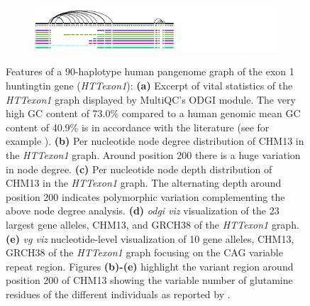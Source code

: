 \begin{figure}[ht!]
\begin{subfigure}{\linewidth}
    \end{subfigure}
    \begin{subfigure}{\linewidth}
        \caption{}
        \centering
        \includegraphics[width=1.0\linewidth, trim=-0.4cm 0.4cm 3.15cm 0cm]{fig/metrics/chr4_pan_HTTex1_STR_xg_svg}
        \label{fig:metrics-str}
    \end{subfigure}
	\caption{Features of a 90-haplotype human pangenome graph of the exon 1 huntingtin gene (\textit{HTTexon1}): \textbf{(a)} Excerpt of vital statistics of the \textit{HTTexon1} graph displayed by MultiQC's ODGI module. The very high GC content of 73.0\% compared to a human genomic mean GC content of 40.9\% \cite{Piovesan2019} is in accordance with the literature (see for example \cite{Sathasivam2013, Neueder2017}). \textbf{(b)} Per nucleotide node degree distribution of CHM13 in the \textit{HTTexon1} graph. Around position 200 there is a huge variation in node degree. \textbf{(c)} Per nucleotide node depth distribution of CHM13 in the \textit{HTTexon1} graph. The alternating depth around position 200 indicates polymorphic variation complementing the above node degree analysis. \textbf{(d)} \textit{odgi viz} visualization of the 23 largest gene alleles, CHM13, and GRCH38 of the \textit{HTTexon1} graph. \textbf{(e)} \textit{vg viz} nucleotide-level visualization of 10 gene alleles, CHM13, GRCH38 of the \textit{HTTexon1} graph focusing on the CAG variable repeat region. Figures \textbf{(b)-(e)} highlight the variant region around position 200 of CHM13 showing the variable number of glutamine residues of the different individuals as reported by \cite{Nance1999}.}
	\label{fig:metrics}
\end{figure}
